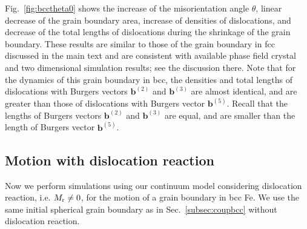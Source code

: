 \documentclass[smallextended]{svjour3}
\begin{document}
Fig.~\ref{fig:bcctheta0}  shows the increase of the misorientation angle $\theta$, linear decrease of the grain boundary area, increase of densities of dislocations, and decrease of the total lengths of dislocations during the shrinkage of the grain boundary. These results are similar to those of the grain boundary in fcc discussed in the main text and are consistent with available phase field crystal and two dimensional simulation results; see the discussion there. Note that for the dynamics of this grain boundary in bcc, the densities and total lengths of dislocations with Burgers vectors $\mathbf b^{(2)}$ and $\mathbf b^{(3)}$ are almost identical, and are greater than those of dislocations with Burgers vector $\mathbf b^{(5)}$. Recall that the lengths of Burgers vectors  $\mathbf b^{(2)}$ and $\mathbf b^{(3)}$ are equal, and are smaller than the length of Burgers vector $\mathbf b^{(5)}$.



\subsection{Motion with dislocation reaction}

Now we perform simulations using our continuum model considering dislocation reaction, i.e. $M_{\rm r}\neq 0$, for the motion of a grain boundary in bcc Fe.  We use the same initial spherical grain boundary as in Sec.~\ref{subsec:coupbcc} without dislocation reaction.
\end{document}
